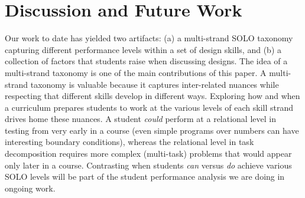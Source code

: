 

\section{Discussion and Future Work}
\label{sec:open-questions}

Our work to date has yielded two artifacts: (a) a multi-strand SOLO
taxonomy capturing different performance levels within a set of design
skills, and (b) a collection of factors that students raise when
discussing designs.  The idea of a multi-strand taxonomy is one of the
main contributions of this paper.  A multi-strand taxonomy is valuable
because it captures inter-related nuances while respecting that
different skills develop in different ways.  Exploring how and when a curriculum
prepares students to work at the various levels of each skill
strand drives home these nuances.  A student \emph{could} perform at a
relational level in testing from very early in a course (even simple
programs over numbers can have interesting boundary conditions),
whereas the relational level in task decomposition requires more
complex (multi-task) problems that would appear only later in a
course.  Contrasting when students \emph{can} versus \emph{do} achieve
various SOLO levels will be part of the student performance analysis
we are doing in ongoing work.

